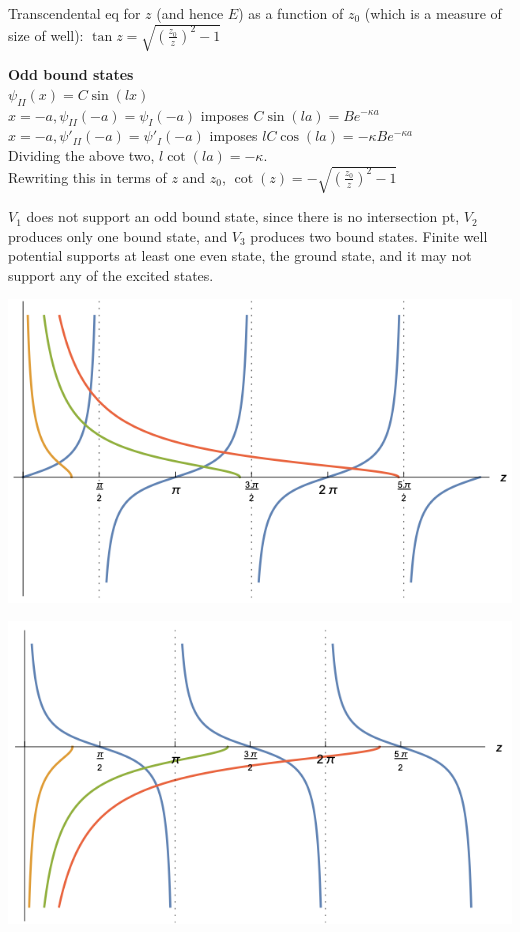 Transcendental eq for $z$ (and hence $E$) as a function of $z_0$ (which is a measure of size of well): $\tan z = \sqrt{(\frac{z_0}{z})^2 - 1}$

\textbf{Odd bound states} \\
$\psi_{II}(x) = C \sin(lx)$ \\

$x = -a, \psi_{II}(-a) = \psi_{I}(-a)$ imposes $C \sin(la) = B e^{-\kappa a}$ \\
$x = -a, \psi'_{II}(-a) = \psi'_{I}(-a)$ imposes $l C \cos(la) = -\kappa B e^{-\kappa a}$ \\

Dividing the above two, $l \cot(la) = -\kappa$. \\
Rewriting this in terms of $z$ and $z_0$, $\cot(z) = - \sqrt{(\frac{z_0}{z})^2 - 1}$

$V_{1}$ does not support an odd bound state, since there is no intersection pt, $V_{2}$ produces only one bound state, and $V_{3}$ produces two bound states. Finite well potential supports at least one even state, the ground state, and it may not support any of the excited states.

\vspace{0em}
\begin{Figure}
    \raggedright
    \includegraphics[width=0.4\columnwidth]{figures/even_finite_square_well.png}
\end{Figure}
\vspace{-1em}

\vspace{-8em}
\begin{Figure}
    \raggedleft
    \includegraphics[width=0.4\columnwidth]{figures/odd_finite_square_well.png}
\end{Figure}
\vspace{-1em}

